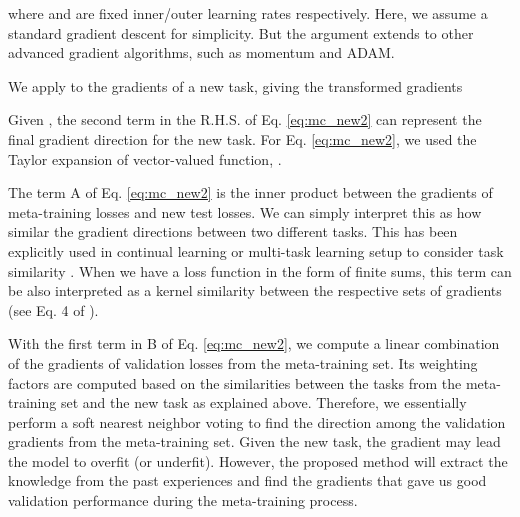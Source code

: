 \documentclass{article}
\begin{document}
where  and  are fixed inner/outer learning rates respectively. Here, we assume a standard gradient descent for simplicity. But the argument extends to other advanced gradient algorithms, such as momentum and ADAM. 



We apply  to the gradients of a new task, giving the transformed gradients
\setlength{\belowdisplayskip}{1pt} \setlength{\belowdisplayshortskip}{1pt}
\setlength{\abovedisplayskip}{1pt} \setlength{\abovedisplayshortskip}{1pt}


Given , the second term in the R.H.S. of Eq. \ref{eq:mc_new2} can represent the final gradient direction for the new task. For Eq. \ref{eq:mc_new2}, we used the Taylor expansion of vector-valued function, .

The term A of Eq. \ref{eq:mc_new2} is the inner product between the gradients of meta-training losses and new test losses. We can simply interpret this as how similar the gradient directions between two different tasks. This has been explicitly used in continual learning or multi-task learning setup to consider task similarity \cite{Du-arxiv-2018,Lopez-nips2017,Riemer-iclr19}. When we have a loss function in the form of finite sums, this term can be also interpreted as a kernel similarity between the respective sets of gradients (see Eq. 4 of \cite{Muandet-nips2012}).

With the first term in B of Eq. \ref{eq:mc_new2}, we compute a linear combination of the gradients of validation losses from the meta-training set. Its weighting factors are computed based on the similarities between the tasks from the meta-training set and the new task as explained above. Therefore, we essentially perform a soft nearest neighbor voting to find the direction among the validation gradients from the meta-training set. Given the new task, the gradient may lead the model to overfit (or underfit). However, the proposed method will extract the knowledge from the past experiences and find the gradients that gave us good validation performance during the meta-training process.
\end{document}
